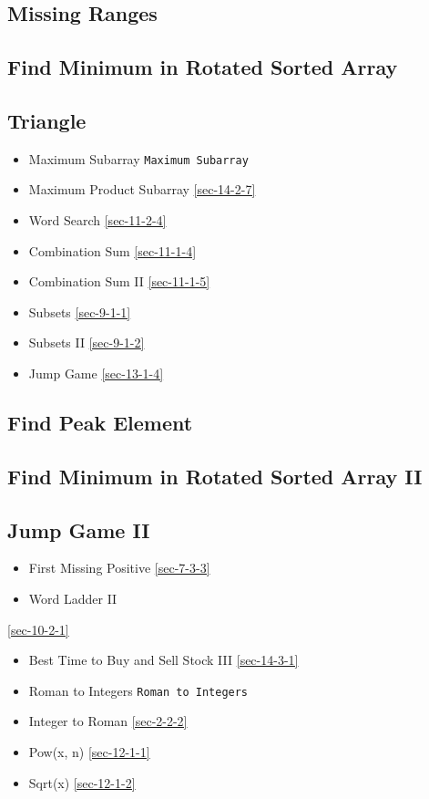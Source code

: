 \documentclass[12pt]{book}
\begin{document}
\subsection{Missing Ranges}
\label{sec-1-4-4}
\subsection{Find Minimum in Rotated Sorted Array}
\label{sec-1-4-5}
\subsection{Triangle}
\label{sec-1-4-6}
\begin{itemize}
\item Maximum Subarray
\texttt{Maximum Subarray}
\item Maximum Product Subarray
\ref{sec-14-2-7}
\item Word Search
\ref{sec-11-2-4}
\item Combination Sum        
\ref{sec-11-1-4}
\item Combination Sum II
\ref{sec-11-1-5}
\item Subsets
\ref{sec-9-1-1}
\item Subsets II
\ref{sec-9-1-2}
\item Jump Game
\ref{sec-13-1-4}
\end{itemize}
\subsection{Find Peak Element}
\label{sec-1-4-7}
\subsection{Find Minimum in Rotated Sorted Array II}
\label{sec-1-4-8}
\subsection{Jump Game II}
\label{sec-1-4-9}
\begin{itemize}
\item First Missing Positive        
\ref{sec-7-3-3}
\item Word Ladder II
\end{itemize}
\ref{sec-10-2-1}
\begin{itemize}
\item Best Time to Buy and Sell Stock III
\ref{sec-14-3-1}
\item Roman to Integers
\texttt{Roman to Integers}
\item Integer to Roman
\ref{sec-2-2-2}
\item Pow(x, n)
\ref{sec-12-1-1}
\item Sqrt(x)
\ref{sec-12-1-2}
\end{itemize}
\end{document}
